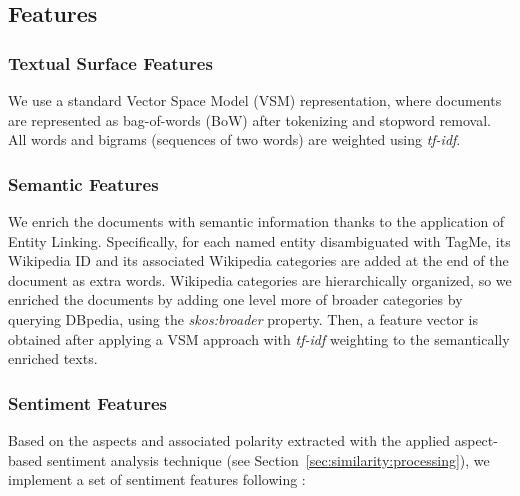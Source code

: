 \subsection{Features}
\label{sec:similarity:features}
\subsubsection{Textual Surface Features}
We use a standard Vector Space Model (VSM) representation, where documents are represented as bag-of-words (BoW) after tokenizing and stopword removal. All words and bigrams (sequences of two words) are weighted using \textit{tf-idf}. 

\subsubsection{Semantic Features}

We enrich the documents with semantic information thanks to the application of Entity Linking. Specifically, for each named entity disambiguated with TagMe, its Wikipedia ID and its associated Wikipedia categories are added at the end of the document as extra words. Wikipedia categories are hierarchically organized, so we enriched the documents by adding one level more of broader categories by querying DBpedia, using the \textit{skos:broader} property.
Then, a feature vector is obtained after applying a VSM approach with \textit{tf-idf} weighting to the semantically enriched texts.


\subsubsection{Sentiment Features} 

Based on the aspects and associated polarity extracted with the applied aspect-based sentiment analysis technique (see Section~\ref{sec:similarity:processing}), we implement a set of sentiment features following \cite{Suero2014}:

